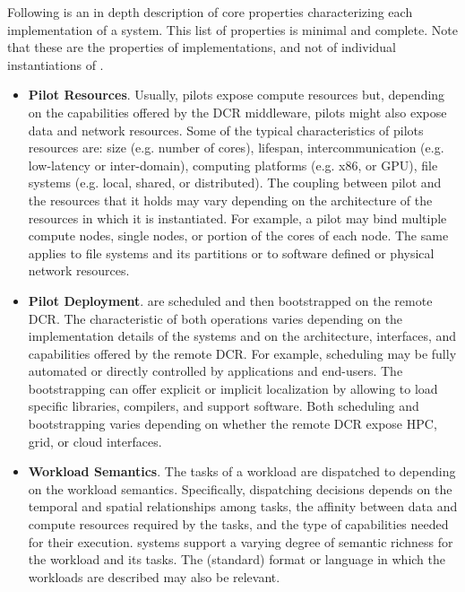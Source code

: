\documentclass{sig-alternate}
\begin{document}
Following is an in depth description of core properties characterizing each
implementation of a \pilot system. This list of properties is minimal and
complete. Note that these are the properties of \pilot implementations, and not
of individual instantiations of \pilots.

\begin{itemize}

\item \textbf{Pilot Resources}. Usually, pilots expose compute resources but,
  depending on the capabilities offered by the DCR middleware, pilots might also
  expose data and network resources. Some of the typical characteristics of
  pilots resources are: size (e.g. number of cores), lifespan,
  intercommunication (e.g. low-latency or inter-domain), computing platforms
  (e.g. x86, or GPU), file systems (e.g. local, shared, or distributed). The
  coupling between pilot and the resources that it holds may vary depending on
  the architecture of the resources in which it is instantiated. For example, a
  pilot may bind multiple compute nodes, single nodes, or portion of the cores
  of each node. The same applies to file systems and its partitions or to
  software defined or physical network resources.

\item \textbf{Pilot Deployment}. \pilots are scheduled and then bootstrapped on
  the remote DCR. The characteristic of both operations varies depending on the
  implementation details of the \pilot systems and on the architecture,
  interfaces, and capabilities offered by the remote DCR. For example, \pilot
  scheduling may be fully automated or directly controlled by applications and
  end-users. The bootstrapping can offer explicit or implicit localization by
  allowing to load specific libraries, compilers, and support software. Both
  scheduling and bootstrapping varies depending on whether the remote DCR expose
  HPC, grid, or cloud interfaces.

\item \textbf{Workload Semantics}. The tasks of a workload are dispatched to
  \pilots depending on the workload semantics. Specifically, dispatching
  decisions depends on the temporal and spatial relationships among tasks, the
  affinity between data and compute resources required by the tasks, and the
  type of capabilities needed for their execution. \pilot systems support a
  varying degree of semantic richness for the workload and its tasks. The
  (standard) format or language in which the workloads are described may also
  be relevant.


\end{itemize}
\end{document}
